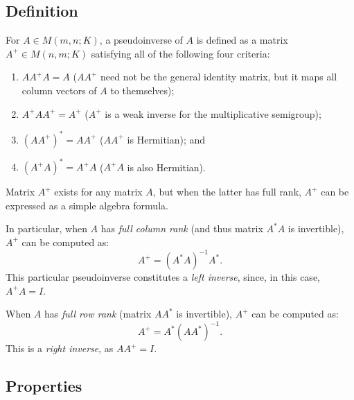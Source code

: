 \subsection{Definition}

For $A \in M(m,n;K)$, a pseudoinverse of $A$ is defined as a matrix $A^{+} \in M(n,m;K)$ satisfying all of the following four criteria:
\begin{enumerate}
    \item $AA^+A = A$ ($AA^+$ need not be the general identity matrix, but it maps all column vectors of $A$ to themselves);
    \item $A^+AA^+ = A^+$ ($A^+$ is a weak inverse for the multiplicative semigroup);
    \item $(AA^+)^* = AA^+$ ($AA^+$ is Hermitian); and 
    \item $(A^+A)^* = A^+A$ ($A^+A$ is also Hermitian).
\end{enumerate}

Matrix $A^+$ exists for any matrix $A$, but when the latter has full rank, $A^+$ can be expressed as a \textcolor[rgb]{1,0,0}{simple algebra formula}.

In particular, when $A$ has \emph{full column rank} (and thus matrix $A^*A$ is invertible), $A^+$ can be computed as:
\begin{equation}
    A^+ = (A^*A)^{-1} A^*.
    \label{eq0.2.1}
\end{equation}
This particular pseudoinverse constitutes a \emph{\textcolor[rgb]{1,0,0}{left inverse}}, since, in this case, $A^+A = I$.

When $A$ has \emph{full row rank} (matrix $AA^*$ is invertible), $A^+$ can be computed as:
\begin{equation}
    A^+ = A^*(AA^*)^{-1}.
    \label{eq0.2.2}
\end{equation}
This is a \emph{\textcolor[rgb]{1,0,0}{right inverse}}, as $AA^+=I$.

\subsection{Properties}

